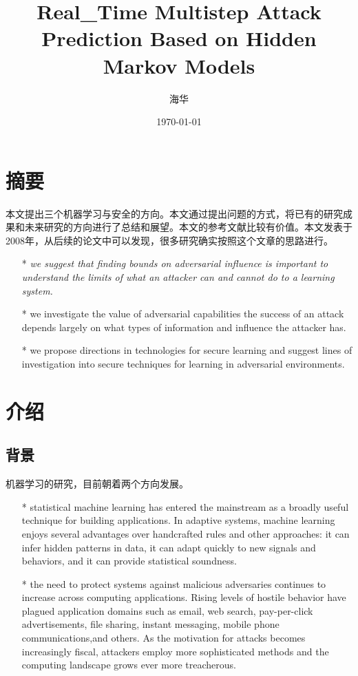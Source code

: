 \documentclass[UTF8]{ctexart}
\title{\heiti Real_Time Multistep Attack Prediction Based on Hidden Markov Models}
\author{\kaishu 海华}
\date{\today}
\begin{document}
    
    \maketitle

    \clearpage
    \section{摘要}\label{sec:diyijie}
  	本文提出三个机器学习与安全的方向。本文通过提出问题的方式，将已有的研究成果和未来研究的方向进行了总结和展望。本文的参考文献比较有价值。本文发表于2008年，从后续的论文中可以发现，很多研究确实按照这个文章的思路进行。
	\begin{itemize}
	\item[*] \textit{we suggest that finding bounds on adversarial influence is important to understand the limits of what an attacker can and cannot do to a learning system.}
	\item[*] we investigate the value of adversarial capabilities the success of an attack depends largely on what types of information and influence the attacker has.
	\item[*] we propose directions in technologies for secure learning and suggest lines of investigation into secure techniques for learning in adversarial environments.
	\end{itemize}
	\clearpage
    \section{介绍}\label{sec:dierjie}
    \subsection{背景}
        机器学习的研究，目前朝着两个方向发展。
	\begin{itemize}
	\item[*] statistical machine learning has entered the mainstream as a broadly useful technique for building applications. In adaptive systems, machine learning enjoys several advantages over handcrafted rules and other approaches: it can infer hidden patterns in data, it can adapt quickly to new signals and behaviors, and it can provide statistical soundness.
	\item[*]the need to protect systems against malicious adversaries continues to increase across computing applications. Rising levels of hostile behavior have plagued application domains such as email, web search, pay-per-click   advertisements, file sharing, instant messaging, mobile phone communications,and others. As the motivation for attacks becomes increasingly fiscal, attackers employ more sophisticated methods and the computing landscape grows ever more treacherous.
	\end{itemize}
	\clearpage
	
\end{document}
